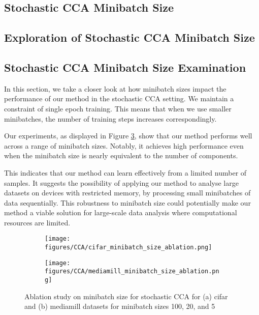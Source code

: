 \subsection{Stochastic CCA Minibatch Size}

\subsection{Exploration of Stochastic CCA Minibatch Size}

\subsection{Stochastic CCA Minibatch Size Examination}

In this section, we take a closer look at how minibatch sizes impact the performance of our method in the stochastic CCA setting. We maintain a constraint of single epoch training. This means that when we use smaller minibatches, the number of training steps increases correspondingly. 

Our experiments, as displayed in Figure \ref{fig:minibatch size ablation}, show that our method performs well across a range of minibatch sizes. Notably, it achieves high performance even when the minibatch size is nearly equivalent to the number of components. 

This indicates that our method can learn effectively from a limited number of samples. It suggests the possibility of applying our method to analyse large datasets on devices with restricted memory, by processing small minibatches of data sequentially. This robustness to minibatch size could potentially make our method a viable solution for large-scale data analysis where computational resources are limited.

\begin{figure}[h]
\centering
     \begin{subfigure}[b]{0.49\textwidth}
         \centering
          \texttt{[image: figures/CCA/cifar\_minibatch\_size\_ablation.png]}
          \caption{}
          \label{fig:cifar_minibatch_ablation}
     \end{subfigure}
     \begin{subfigure}[b]{0.49\textwidth}
         \centering
          \texttt{[image: figures/CCA/mediamill\_minibatch\_size\_ablation.png]}
          \caption{}
          \label{fig:mediamill_minibatch_ablation}
     \end{subfigure}
\caption{Ablation study on minibatch size for stochastic CCA for (a) cifar and (b) mediamill datasets for minibatch sizes 100, 20, and 5}
\label{fig:minibatch size ablation}
\end{figure}

